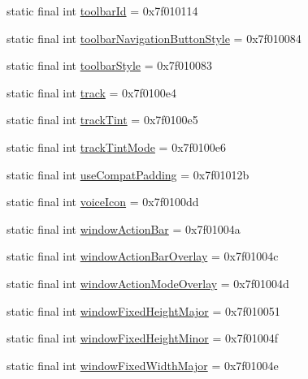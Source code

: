 \begin{CompactItemize}
\item 
static final int \hyperlink{classandroid_1_1support_1_1v7_1_1palette_1_1_r_1_1attr_4cb454c12a177ce59221a1ea575b9de4}{toolbarId} = 0x7f010114
\item 
static final int \hyperlink{classandroid_1_1support_1_1v7_1_1palette_1_1_r_1_1attr_931452f0bb25c2a75099c4aea5a15682}{toolbarNavigationButtonStyle} = 0x7f010084
\item 
static final int \hyperlink{classandroid_1_1support_1_1v7_1_1palette_1_1_r_1_1attr_78bab4cf6dd4488f8fa63929f606d912}{toolbarStyle} = 0x7f010083
\item 
static final int \hyperlink{classandroid_1_1support_1_1v7_1_1palette_1_1_r_1_1attr_578ee0a7b857d3e21d27003d6b2001cf}{track} = 0x7f0100e4
\item 
static final int \hyperlink{classandroid_1_1support_1_1v7_1_1palette_1_1_r_1_1attr_5cbc23f0097a34469b54183149d483b1}{trackTint} = 0x7f0100e5
\item 
static final int \hyperlink{classandroid_1_1support_1_1v7_1_1palette_1_1_r_1_1attr_53448ed69b9946b849a38f2120f3d39d}{trackTintMode} = 0x7f0100e6
\item 
static final int \hyperlink{classandroid_1_1support_1_1v7_1_1palette_1_1_r_1_1attr_bf42b17fb41687813f482b5813488a72}{useCompatPadding} = 0x7f01012b
\item 
static final int \hyperlink{classandroid_1_1support_1_1v7_1_1palette_1_1_r_1_1attr_28aec8d667bd248f8b030403f2b6384d}{voiceIcon} = 0x7f0100dd
\item 
static final int \hyperlink{classandroid_1_1support_1_1v7_1_1palette_1_1_r_1_1attr_71e2b64e084d4b76d675dada45b9ac8b}{windowActionBar} = 0x7f01004a
\item 
static final int \hyperlink{classandroid_1_1support_1_1v7_1_1palette_1_1_r_1_1attr_82927d28226c8205d1f14897fedcba2a}{windowActionBarOverlay} = 0x7f01004c
\item 
static final int \hyperlink{classandroid_1_1support_1_1v7_1_1palette_1_1_r_1_1attr_16736333a8e367a30d23a79f350ba1c2}{windowActionModeOverlay} = 0x7f01004d
\item 
static final int \hyperlink{classandroid_1_1support_1_1v7_1_1palette_1_1_r_1_1attr_7092daf55c8b157004cd3ea2e4e3ae1f}{windowFixedHeightMajor} = 0x7f010051
\item 
static final int \hyperlink{classandroid_1_1support_1_1v7_1_1palette_1_1_r_1_1attr_2ae558a0661695d071a53df65cd2667f}{windowFixedHeightMinor} = 0x7f01004f
\item 
static final int \hyperlink{classandroid_1_1support_1_1v7_1_1palette_1_1_r_1_1attr_1127690ade65f3c76ef35dd2fc42eeaa}{windowFixedWidthMajor} = 0x7f01004e

\end{CompactItemize}
